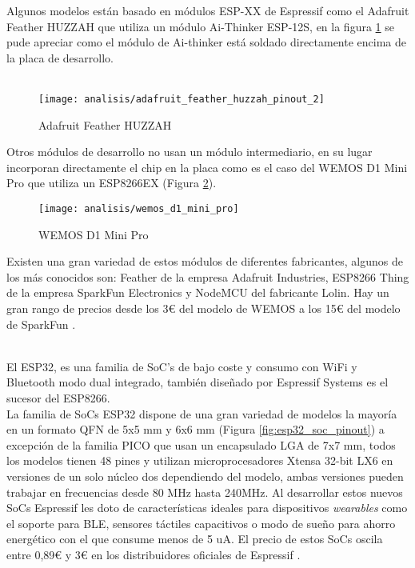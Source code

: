 \documentclass[../proyecto.tex]{subfiles}
\begin{document}
Algunos modelos están basado en módulos ESP-XX de Espressif como el Adafruit Feather HUZZAH \cite{adafruit_feather_huzzah} que utiliza un módulo Ai-Thinker ESP-12S, en la figura \ref{fig:adafruit_feather_huzzah_pinout_2} se pude apreciar como el módulo de Ai-thinker está soldado directamente encima de la placa de desarrollo.\\~\\

\begin{figure}[H]
\centering
\texttt{[image: analisis/adafruit\_feather\_huzzah\_pinout\_2]}
\caption{Adafruit Feather HUZZAH}
\label{fig:adafruit_feather_huzzah_pinout_2}
\end{figure}

Otros módulos de desarrollo no usan un módulo intermediario, en su lugar incorporan directamente el chip en la placa como es el caso del WEMOS D1 Mini Pro \cite{wemos_d1_mini_pro} que utiliza un ESP8266EX (Figura \ref{fig:wemos_d1_mini_pro}).\\

\begin{figure}[h]
\centering
\texttt{[image: analisis/wemos\_d1\_mini\_pro]}
\caption{WEMOS D1 Mini Pro}
\label{fig:wemos_d1_mini_pro}
\end{figure}

Existen una gran variedad de estos módulos de diferentes fabricantes, algunos de los más conocidos son:  Feather de la empresa Adafruit Industries, ESP8266 Thing de la empresa SparkFun Electronics y NodeMCU del fabricante Lolin. Hay un gran rango de precios desde los 3€ del modelo de WEMOS a los 15€ del modelo de SparkFun \cite{espressif_provider_digikey} \cite{espressif_provider_mouser}\cite{sparkfun_thing_official_page}.\\

\pagebreak

\\
El ESP32, es una familia de SoC's de bajo coste y consumo con WiFi y Bluetooth modo dual integrado, también diseñado por Espressif Systems \cite{esp32_overview} es el sucesor del ESP8266.\\

La familia de SoCs ESP32 dispone de una gran variedad de modelos la mayoría en un formato QFN de 5x5 mm y 6x6 mm (Figura \ref{fig:esp32_soc_pinout}) a excepción de la familia PICO que usan un encapsulado LGA de 7x7 mm, todos los modelos tienen 48 pines y utilizan microprocesadores Xtensa 32-bit LX6 en versiones de un solo núcleo dos dependiendo del modelo, ambas versiones pueden trabajar en frecuencias desde 80 MHz hasta 240MHz. Al desarrollar estos nuevos SoCs Espressif les doto de características ideales para dispositivos \textit{wearables} como el soporte para BLE, sensores táctiles capacitivos o modo de sueño para ahorro energético con el que consume menos de 5  uA. El precio de estos SoCs oscila entre 0,89€ y 3€ en los distribuidores oficiales de Espressif \cite{espressif_provider_digikey} \cite{espressif_provider_mouser}.\\
\end{document}

